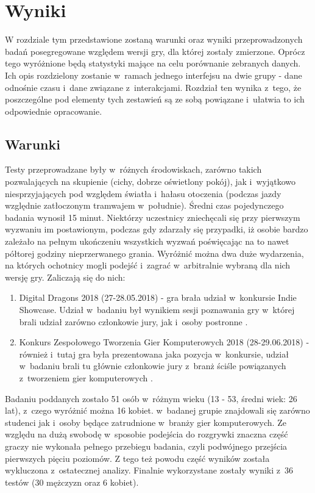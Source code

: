 \documentclass[a4paper,12pt,numbers=noenddot]{report}
\begin{document}
\chapter{Wyniki}
W rozdziale tym przedstawione zostaną warunki oraz wyniki przeprowadzonych badań posegregowane względem wersji gry, dla której zostały zmierzone. Oprócz tego wyróżnione będą statystyki mające na celu porównanie zebranych danych. Ich opis rozdzielony zostanie w~ramach jednego interfejsu na dwie grupy - dane odnośnie czasu i~dane związane z~interakcjami. Rozdział ten wynika z~tego, że poszczególne pod elementy tych zestawień są ze sobą powiązane i~ułatwia to ich odpowiednie opracowanie.

\section{Warunki}
Testy przeprowadzane były w~różnych środowiskach, zarówno takich pozwalających na skupienie (cichy, dobrze oświetlony pokój), jak i~wyjątkowo niesprzyjających pod względem światła i~hałasu otoczenia (podczas jazdy względnie zatłoczonym tramwajem w~południe). Średni czas pojedynczego badania wynosił 15 minut. Niektórzy uczestnicy zniechęcali się przy pierwszym wyzwaniu im postawionym, podczas gdy zdarzały się przypadki, iż osobie bardzo zależało na pełnym ukończeniu wszystkich wyzwań poświęcając na to nawet półtorej godziny nieprzerwanego grania. Wyróżnić można dwa duże wydarzenia, na których ochotnicy mogli podejść i~zagrać w~arbitralnie wybraną dla nich wersję gry. Zaliczają się do nich:
\begin{enumerate}
\item Digital Dragons 2018 (27-28.05.2018) - gra brała udział w~konkursie Indie Showcase. Udział w~badaniu był wynikiem sesji poznawania gry w~której brali udział zarówno członkowie jury, jak i~osoby postronne \cite{online_DD}.
\item Konkurs Zespołowego Tworzenia Gier Komputerowych 2018 (28-29.06.2018) - również i~tutaj gra była prezentowana jaka pozycja w~konkursie, udział w~badaniu brali tu głównie członkowie jury z~branż ściśle powiązanych z~tworzeniem gier komputerowych \cite{online_ZTGK}.
\end{enumerate}
Badaniu poddanych zostało 51 osób w~różnym wieku (13 - 53, średni wiek: 26 lat), z~czego wyróżnić można 16 kobiet. w~badanej grupie znajdowali się zarówno studenci jak i~osoby będące zatrudnione w~branży gier komputerowych. Ze względu na dużą swobodę w~sposobie podejścia do rozgrywki znaczna część graczy nie wykonała pełnego przebiegu badania, czyli podwójnego przejścia pierwszych pięciu poziomów. Z tego też powodu część wyników została wykluczona z~ostatecznej analizy. Finalnie wykorzystane zostały wyniki z~36 testów (30 mężczyzn oraz 6 kobiet).
\end{document}
